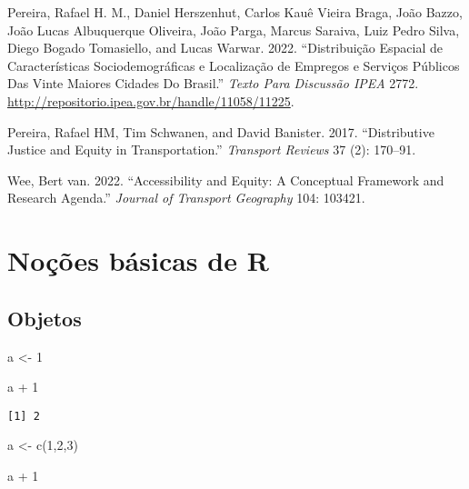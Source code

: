 \documentclass[
  letterpaper,
  DIV=11,
  numbers=noendperiod]{scrreprt}
\newenvironment{Shaded}{\begin{snugshade}}{\end{snugshade}}
\newcommand{\DecValTok}[1]{\textcolor[rgb]{0.68,0.00,0.00}{#1}}
\newcommand{\FunctionTok}[1]{\textcolor[rgb]{0.28,0.35,0.67}{#1}}
\newcommand{\NormalTok}[1]{\textcolor[rgb]{0.00,0.23,0.31}{#1}}
\newcommand{\OtherTok}[1]{\textcolor[rgb]{0.00,0.23,0.31}{#1}}
\newcommand{\SpecialCharTok}[1]{\textcolor[rgb]{0.37,0.37,0.37}{#1}}
\newlength{\cslhangindent}
\newlength{\cslentryspacingunit} %
\newenvironment{CSLReferences}[2] %
 {%
  \setlength{\parindent}{0pt}
  \ifodd #1
  \let\oldpar\par
  \def\par{\hangindent=\cslhangindent\oldpar}
  \fi
  \setlength{\parskip}{#2\cslentryspacingunit}
 }%
 {}
\begin{document}
\begin{CSLReferences}{1}{0}
\leavevmode{}%
Pereira, Rafael H. M., Daniel Herszenhut, Carlos Kauê Vieira Braga, João
Bazzo, João Lucas Albuquerque Oliveira, João Parga, Marcus Saraiva, Luiz
Pedro Silva, Diego Bogado Tomasiello, and Lucas Warwar. 2022.
{``Distribuição Espacial de Características Sociodemográficas e
Localização de Empregos e Serviços Públicos Das Vinte Maiores Cidades Do
Brasil.''} \emph{Texto Para Discuss{ã}o IPEA} 2772.
\url{http://repositorio.ipea.gov.br/handle/11058/11225}.

\leavevmode{}%
Pereira, Rafael HM, Tim Schwanen, and David Banister. 2017.
{``Distributive Justice and Equity in Transportation.''} \emph{Transport
Reviews} 37 (2): 170--91.

\leavevmode{}%
Wee, Bert van. 2022. {``Accessibility and Equity: A Conceptual Framework
and Research Agenda.''} \emph{Journal of Transport Geography} 104:
103421.

\end{CSLReferences}

\appendix
{}

\hypertarget{nouxe7uxf5es-buxe1sicas-de-r}{%
\chapter{Noções básicas de R}\label{nouxe7uxf5es-buxe1sicas-de-r}}

\hypertarget{objetos}{%
\section{Objetos}\label{objetos}}

\begin{Shaded}
\begin{Highlighting}[]
\NormalTok{a }\OtherTok{\textless{}{-}} \DecValTok{1}

\NormalTok{a }\SpecialCharTok{+} \DecValTok{1}
\end{Highlighting}
\end{Shaded}

\begin{verbatim}
[1] 2
\end{verbatim}

\begin{Shaded}
\begin{Highlighting}[]
\NormalTok{a }\OtherTok{\textless{}{-}} \FunctionTok{c}\NormalTok{(}\DecValTok{1}\NormalTok{,}\DecValTok{2}\NormalTok{,}\DecValTok{3}\NormalTok{)}

\NormalTok{a }\SpecialCharTok{+} \DecValTok{1}
\end{Highlighting}
\end{Shaded}
\end{document}
